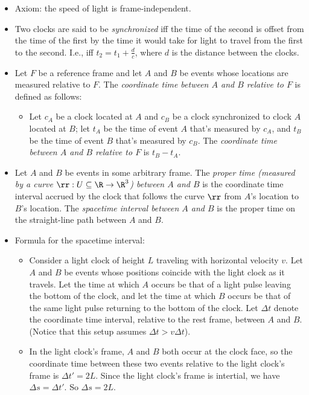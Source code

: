 \begin{itemize}
	\item Axiom: the speed of light is frame-independent.
	\item Two clocks are said to be \textit{synchronized} iff the time of the second is offset from the time of the first by the time it would take for light to travel from the first to the second. I.e., iff $t_2 = t_1 + \frac{d}{c}$, where $d$ is the distance between the clocks.
	\item Let $F$ be a reference frame and let $A$ and $B$ be events whose locations are measured relative to $F$. The \textit{coordinate time between $A$ and $B$ relative to $F$} is defined as follows:
	\begin{itemize}
		\item Let $c_A$ be a clock located at $A$ and $c_B$ be a clock synchronized to clock $A$ located at $B$; let $t_A$ be the time of event $A$ that's measured by $c_A$, and $t_B$ be the time of event $B$ that's measured by $c_B$. The \textit{coordinate time between $A$ and $B$ relative to $F$} is $t_B - t_A$.
	\end{itemize}
	\item Let $A$ and $B$ be events in some arbitrary frame. The \textit{proper time (measured by a curve $\rr:U \subseteq \R \rightarrow \R^3$) between $A$ and $B$} is the coordinate time interval accrued by the clock that follows the curve $\rr$ from $A$'s location to $B$'s location. The \textit{spacetime interval between $A$ and $B$} is the proper time on the straight-line path between $A$ and $B$.
	\item Formula for the spacetime interval:
	\begin{itemize}
		\item Consider a light clock of height $L$ traveling with horizontal velocity $v$. Let $A$ and $B$ be events whose positions coincide with the light clock as it travels. Let the time at which $A$ occurs be that of a light pulse leaving the bottom of the clock, and let the time at which $B$ occurs be that of the same light pulse returning to the bottom of the clock. Let $\Delta t$ denote the coordinate time interval, relative to the rest frame, between $A$ and $B$. (Notice that this setup assumes $\Delta t > v \Delta t$).
		\item In the light clock's frame, $A$ and $B$ both occur at the clock face, so the coordinate time between these two events relative to the light clock's frame is $\Delta t' = 2L$. Since the light clock's frame is intertial, we have $\Delta s = \Delta t'$. So $\Delta s = 2L$.

\end{itemize}
\end{itemize}
